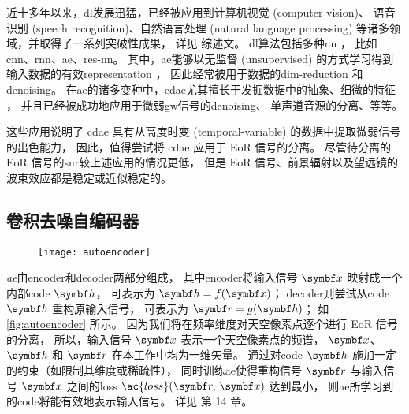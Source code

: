 近十多年以来，\ac{dl}发展迅猛，已经被应用到计算机视觉 (computer vision)、
语音识别 (speech recognition)、自然语言处理 (natural language processing)
等诸多领域，并取得了一系列突破性成果，
详见  综述文。
\ac{dl}算法包括多种\ac{nn} \cite{bengio2009,leCun2015,schmidhuber2015}，
比如\ac{cnn}、\ac{rnn}、\ac{ae}、\ac{res-nn}。
其中，\ac{ae}能够以无监督 (unsupervised) 的方式学习得到
输入数据的有效\ac{representation} \cite{bourlard1988}，
因此经常被用于数据的\ac{dim-reduction}\cite{hinton2006,wang2014}
和\ac{denoising}\cite{xie2012,lu2013,bengio2013}。
在\ac{ae}的诸多变种中，\ac{cdae}尤其擅长于发掘数据中的抽象、细微的特征 \cite{du2017}，
并且已经被成功地应用于微弱\ac{gw}信号的\ac{denoising}\cite{shen2017}、
单声道音源的分离\cite{grais2017}、等等。

这些应用说明了 \ac{cdae} 具有从高度时变 (temporal-variable)
的数据中提取微弱信号的出色能力，
因此，值得尝试将 \ac{cdae} 应用于 EoR 信号的分离。
尽管待分离的 EoR 信号的\ac{snr}较上述应用的情况更低，
但是 EoR 信号、前景辐射以及望远镜的波束效应都是稳定或近似稳定的。

\subsection{卷积去噪自编码器}
\label{sec:cdae}

\begin{figure}[htp]
  \centering
  \texttt{[image: autoencoder]}
  \label{fig:autoencoder}
\end{figure}

\emph{\ac{ae}}由\ac{encoder}和\ac{decoder}两部分组成，
其中\ac{encoder}将输入信号 $\B{x}$ 映射成一个内部\ac{code} $\B{h}$，
可表示为 $\B{h} = f(\B{x})$；
\ac{decoder}则尝试从\ac{code} $\B{h}$ 重构原输入信号，
可表示为 $\B{r} = g(\B{h})$；
如\autoref{fig:autoencoder} 所示。
因为我们将在频率维度对天空像素点逐个进行 EoR 信号的分离，
所以，输入信号 $\B{x}$ 表示一个天空像素点的频谱，
$\B{x}$、$\B{h}$ 和 $\B{r}$ 在本工作中均为一维矢量。
通过对\ac{code} $\B{h}$ 施加一定的约束（如限制其维度或稀疏性），
同时训练\ac{ae}使得重构信号 $\B{r}$ 与输入信号 $\B{x}$
之间的\acl{loss} $\ac{loss}(\B{r}, \,\B{x})$ 达到最小，
则\ac{ae}所学习到的\ac{code}将能有效地表示输入信号。
详见  第 14 章。

